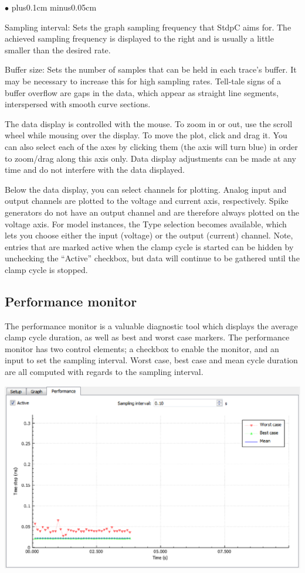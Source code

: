 \documentclass{article}
\newenvironment{myitem}{\begin{list}{$\bullet$}{\setlength{\leftmargin}{1.1em}
\itemsep0.1cm plus0.1cm minus0.05cm
\listparindent0cm
\addtolength{\labelsep}{0.5\labelsep}
\setlength{\labelwidth}{0.8em}
\setlength{\leftmargin}{\labelwidth}
\addtolength{\leftmargin}{\labelsep}
}}{\end{list}}
\begin{document}
\begin{myitem}
\item Sampling interval: Sets the graph sampling frequency that StdpC aims for.
The achieved sampling frequency is displayed to the right and is usually a little
smaller than the desired rate.
\item Buffer size: Sets the number of samples that can be held in each trace's buffer.
It may be necessary to increase this for high sampling rates. Tell-tale signs of a
buffer overflow are gaps in the data, which appear as straight line segments,
interspersed with smooth curve sections.
\item The data display is controlled with the mouse. To zoom in or out, use the scroll
wheel while mousing over the display. To move the plot, click and drag it. You can also select
each of the axes by clicking them (the axis will turn blue) in order to zoom/drag along
this axis only. Data display adjustments can be made at any time and do not interfere with
the data displayed.
\item Below the data display, you can select channels for plotting. Analog input and output
channels are plotted to the voltage and current axis, respectively. Spike generators
do not have an output channel and are therefore always plotted on the voltage axis.
For model instances, the Type selection becomes available, which lets you choose either
the input (voltage) or the output (current) channel. Note, entries that are marked
active when the clamp cycle is started can be hidden by unchecking the ``Active'' checkbox,
but data will continue to be gathered until the clamp cycle is stopped.
\end{myitem}

\subsection{Performance monitor}
The performance monitor is a valuable diagnostic tool which displays the
average clamp cycle duration, as well as best and worst case markers. The performance
monitor has two control elements; a checkbox to enable the monitor, and an input to
set the sampling interval. Worst case, best case and mean cycle duration are all
computed with regards to the sampling interval. \\[0.2cm]
\parbox{\textwidth}{
	\includegraphics[scale=0.6]{performanceMonitor}
} \\[0.2cm]
\end{document}

